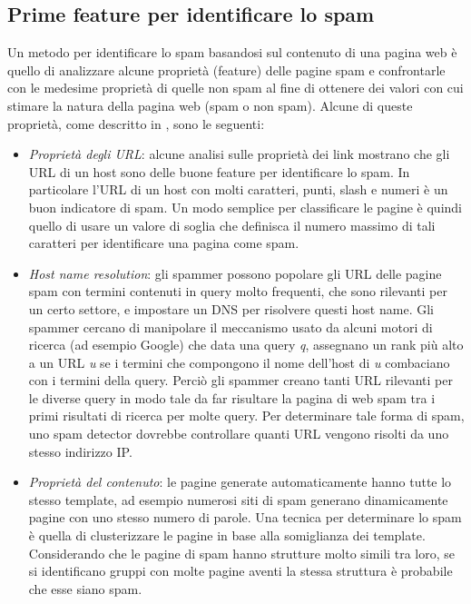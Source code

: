 \subsection{Prime feature per identificare lo spam}
\label{subsec:Feature}
Un metodo per identificare lo spam basandosi sul contenuto di una pagina web è quello di analizzare alcune proprietà (feature) delle pagine spam e confrontarle  con le medesime proprietà di quelle non spam al fine di ottenere dei valori con cui stimare la natura della pagina web (spam o non spam). Alcune di queste proprietà, come descritto in \cite{Fetterly:2004:SDS:1017074.1017077}, sono le seguenti:
\begin{itemize}
 \item 	\textit{Proprietà degli URL}: alcune analisi sulle proprietà dei link mostrano che gli URL di un host sono delle buone feature per identificare lo spam. In particolare l'URL di un host con molti caratteri, punti, slash e numeri è un buon indicatore di spam. Un modo semplice per classificare le pagine è quindi quello di usare un valore di soglia che definisca il numero massimo di tali caratteri per identificare una pagina come spam. 
 
 \item \textit{Host name resolution}: gli spammer possono popolare gli URL delle pagine spam con termini contenuti in query molto frequenti, che sono rilevanti per un certo settore,  e impostare un DNS per risolvere questi host name. Gli spammer cercano di manipolare il meccanismo  usato da alcuni motori di ricerca (ad esempio Google) che data una query \textit{q}, assegnano un rank più alto a un URL \textit{u} se i termini che compongono  il nome dell'host di \textit{u} combaciano con i termini della query. Perciò gli spammer creano tanti URL rilevanti per le diverse query in modo tale da far risultare la pagina di web spam tra i primi risultati di ricerca per molte query. Per determinare tale forma di spam, uno spam detector dovrebbe controllare quanti URL vengono risolti da uno stesso indirizzo IP.
 
 \item \textit{Proprietà del contenuto}: le pagine generate automaticamente hanno tutte lo stesso template, ad esempio numerosi siti di spam generano dinamicamente pagine con uno stesso numero di parole. Una tecnica per determinare lo spam è quella di clusterizzare le pagine in base alla somiglianza dei template. Considerando che le pagine di spam hanno strutture molto simili tra loro, se si identificano gruppi con molte pagine aventi la stessa struttura è probabile che esse siano spam.
\end{itemize}

